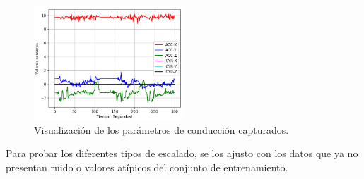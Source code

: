 \begin{figure}[h!]
  \begin{center}	\includegraphics[width=0.5\textwidth]{imagenes/Cap3/datos_sin_preprocesamiento}
  \caption{Visualizaci\'{o}n de los par\'{a}metros de conducci\'{o}n capturados.}
  \label{fig:datos_puros}
  \end{center}
\end{figure}

\vspace{5mm} %

Para probar los diferentes tipos de escalado, se los ajusto con los datos que ya no presentan ruido o valores at\'{i}picos del conjunto de entrenamiento.

